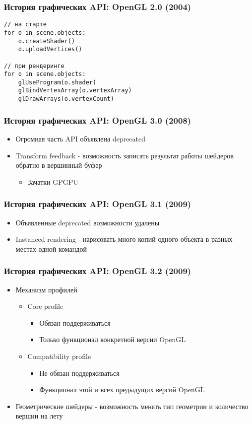 \documentclass{beamer}
\begin{document}
\begin{frame}[fragile]
\frametitle{История графических API: OpenGL 2.0 (2004)}
\begin{verbatim}
// на старте
for o in scene.objects:
    o.createShader()
    o.uploadVertices()

// при рендеринге
for o in scene.objects:
    glUseProgram(o.shader)
    glBindVertexArray(o.vertexArray)
    glDrawArrays(o.vertexCount)
\end{verbatim}
\end{frame}

\begin{frame}
\frametitle{История графических API: OpenGL 3.0 (2008)}
\begin{itemize}
\item Огромная часть API объявлена deprecated
\pause
\item Transform feedback - возможность записать результат работы шейдеров обратно в вершинный буфер
\begin{itemize}
\item Зачатки GPGPU
\end{itemize}
\end{itemize}
\end{frame}

\begin{frame}
\frametitle{История графических API: OpenGL 3.1 (2009)}
\begin{itemize}
\item Объявленные deprecated возможности удалены
\pause
\item Instanced rendering - нарисовать много копий одного объекта в разных местах одной командой
\end{itemize}
\end{frame}

\begin{frame}
\frametitle{История графических API: OpenGL 3.2 (2009)}
\begin{itemize}
\item Механизм профилей
\begin{itemize}
\item Core profile
\begin{itemize}
\item Обязан поддерживаться
\item Только функционал конкретной версии OpenGL
\end{itemize}
\item Compatibility profile
\begin{itemize}
\item Не обязан поддерживаться
\item Функционал этой и всех предыдущих версий OpenGL
\end{itemize}
\end{itemize}
\pause
\item Геометрические шейдеры - возможность менять тип геометрии и количество вершин на лету
\end{itemize}
\end{frame}
\end{document}
